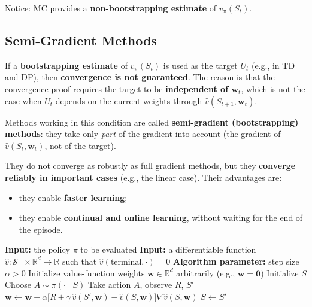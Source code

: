 \documentclass[11pt,a4paper]{article}
\theoremstyle{definition}
\theoremstyle{plain}
\theoremstyle{remark}
\begin{document}
Notice: MC provides a \textbf{non-bootstrapping estimate} of $v_\pi(S_t)$.

\subsection{Semi-Gradient Methods}

If a \textbf{bootstrapping estimate} of $v_\pi(S_t)$ is used as the target $U_t$ (e.g., in TD and DP), then \textbf{convergence is not guaranteed}. The reason is that the convergence proof requires the target to be \textbf{independent of $\mathbf{w}_t$}, which is not the case when $U_t$ depends on the current weights through $\hat{v}(S_{t+1}, \mathbf{w}_t)$.

Methods working in this condition are called \textbf{semi-gradient (bootstrapping) methods}: they take only \emph{part} of the gradient into account (the gradient of $\hat{v}(S_t, \mathbf{w}_t)$, not of the target).

\begin{tcolorbox}[colback=green!5!white, colframe=green!60!black, title={Advantages of Semi-Gradient Methods}]
They do not converge as robustly as full gradient methods, but they \textbf{converge reliably in important cases} (e.g., the linear case). Their advantages are:
\begin{itemize}
    \item they enable \textbf{faster learning};
    \item they enable \textbf{continual and online learning}, without waiting for the end of the episode.
\end{itemize}
\end{tcolorbox}

\begin{algorithm}[H]
\caption{Semi-gradient TD(0) for estimating $\hat{v} \approx v_\pi$}
\begin{algorithmic}
\STATE \textbf{Input:} the policy $\pi$ to be evaluated
\STATE \textbf{Input:} a differentiable function $\hat{v} : \mathcal{S}^+ \times \mathbb{R}^d \to \mathbb{R}$ such that $\hat{v}(\text{terminal}, \cdot) = 0$
\STATE \textbf{Algorithm parameter:} step size $\alpha > 0$
\STATE Initialize value-function weights $\mathbf{w} \in \mathbb{R}^d$ arbitrarily (e.g., $\mathbf{w} = \mathbf{0}$)
    \STATE Initialize $S$
    \REPEAT
        \STATE Choose $A \sim \pi(\cdot \mid S)$
        \STATE Take action $A$, observe $R$, $S'$
        \STATE $\mathbf{w} \leftarrow \mathbf{w} + \alpha \bigl[R + \gamma\, \hat{v}(S', \mathbf{w}) - \hat{v}(S, \mathbf{w})\bigr] \nabla \hat{v}(S, \mathbf{w})$
        \STATE $S \leftarrow S'$
\ENDFOR
\end{algorithmic}
\end{algorithm}
\end{document}
